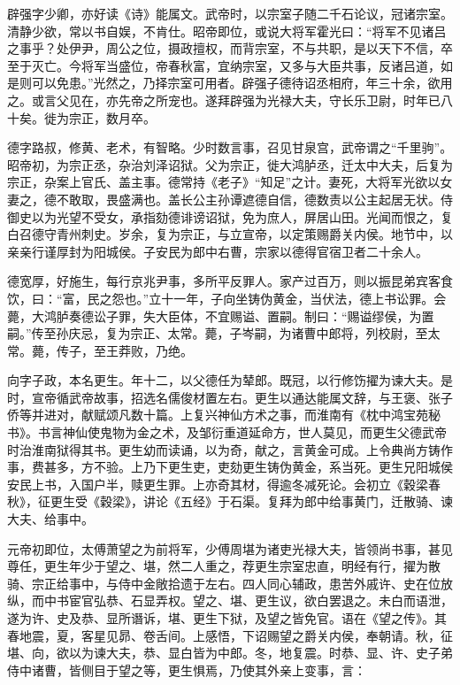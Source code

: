 \documentclass[]{article}
\begin{document}
辟强字少卿，亦好读《诗》能属文。武帝时，以宗室子随二千石论议，冠诸宗室。清静少欲，常以书自娱，不肯仕。昭帝即位，或说大将军霍光曰：``将军不见诸吕之事乎？处伊尹，周公之位，摄政擅权，而背宗室，不与共职，是以天下不信，卒至于灭亡。今将军当盛位，帝春秋富，宜纳宗室，又多与大臣共事，反诸吕道，如是则可以免患。''光然之，乃择宗室可用者。辟强子德待诏丞相府，年三十余，欲用之。或言父见在，亦先帝之所宠也。遂拜辟强为光禄大夫，守长乐卫尉，时年已八十矣。徙为宗正，数月卒。

德字路叔，修黄、老术，有智略。少时数言事，召见甘泉宫，武帝谓之``千里驹''。昭帝初，为宗正丞，杂治刘泽诏狱。父为宗正，徙大鸿胪丞，迁太中大夫，后复为宗正，杂案上官氏、盖主事。德常持《老子》``知足''之计。妻死，大将军光欲以女妻之，德不敢取，畏盛满也。盖长公主孙谭遮德自信，德数责以公主起居无状。侍御史以为光望不受女，承指劾德诽谤诏狱，免为庶人，屏居山田。光闻而恨之，复白召德守青州刺史。岁余，复为宗正，与立宣帝，以定策赐爵关内侯。地节中，以亲亲行谨厚封为阳城侯。子安民为郎中右曹，宗家以德得官宿卫者二十余人。

德宽厚，好施生，每行京兆尹事，多所平反罪人。家产过百万，则以振昆弟宾客食饮，曰：``富，民之怨也。''立十一年，子向坐铸伪黄金，当伏法，德上书讼罪。会薨，大鸿胪奏德讼子罪，失大臣体，不宜赐谥、置嗣。制曰：``赐谥缪侯，为置嗣。''传至孙庆忌，复为宗正、太常。薨，子岑嗣，为诸曹中郎将，列校尉，至太常。薨，传子，至王莽败，乃绝。

向字子政，本名更生。年十二，以父德任为辇郎。既冠，以行修饬擢为谏大夫。是时，宣帝循武帝故事，招选名儒俊材置左右。更生以通达能属文辞，与王褒、张子侨等并进对，献赋颂凡数十篇。上复兴神仙方术之事，而淮南有《枕中鸿宝苑秘书》。书言神仙使鬼物为金之术，及邹衍重道延命方，世人莫见，而更生父德武帝时治淮南狱得其书。更生幼而读诵，以为奇，献之，言黄金可成。上令典尚方铸作事，费甚多，方不验。上乃下更生吏，吏劾更生铸伪黄金，系当死。更生兄阳城侯安民上书，入国户半，赎更生罪。上亦奇其材，得逾冬减死论。会初立《穀梁春秋》，征更生受《穀梁》，讲论《五经》于石渠。复拜为郎中给事黄门，迁散骑、谏大夫、给事中。

元帝初即位，太傅萧望之为前将军，少傅周堪为诸吏光禄大夫，皆领尚书事，甚见尊任，更生年少于望之、堪，然二人重之，荐更生宗室忠直，明经有行，擢为散骑、宗正给事中，与侍中金敞拾遗于左右。四人同心辅政，患苦外戚许、史在位放纵，而中书宦官弘恭、石显弄权。望之、堪、更生议，欲白罢退之。未白而语泄，遂为许、史及恭、显所谮诉，堪、更生下狱，及望之皆免官。语在《望之传》。其春地震，夏，客星见昴、卷舌间。上感悟，下诏赐望之爵关内侯，奉朝请。秋，征堪、向，欲以为谏大夫，恭、显白皆为中郎。冬，地复震。时恭、显、许、史子弟侍中诸曹，皆侧目于望之等，更生惧焉，乃使其外亲上变事，言：
\end{document}
